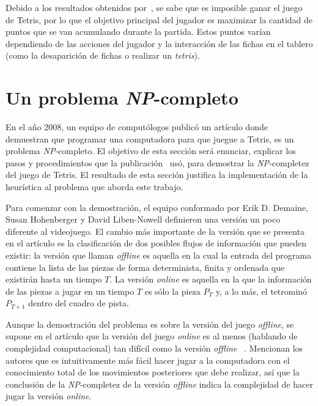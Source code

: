 Debido a los resultados obtenidos por~\cite{Burgiel97howto}, se sabe que es
imposible ganar el juego de Tetris, por lo que el objetivo principal del
jugador es maximizar la cantidad de puntos que se van acumulando durante la
partida. Estos puntos varían dependiendo de las acciones del jugador y la
interacción de las fichas en el tablero (como la desaparición de fichas o
realizar un \textit{tetris}).


\section{Un problema \textsl{NP}-completo}

En el año 2008, un equipo de computólogos publicó un artículo donde demuestran
que programar una computadora para que juegue a Tetris, es un problema \textsl{NP}-completo.
El objetivo de esta sección será enunciar, explicar los pasos y procedimientos
que la publicación~\cite{DBLP:journals/corr/cs-CC-0210020} usó, para demostrar
la \textsl{NP}-completez del juego de Tetris. El resultado de esta sección
justifica la implementación de la heurística al problema que aborda este
trabajo.

Para comenzar con la demostración, el equipo conformado por Erik D. Demaine,
Susan Hohenberger y David Liben-Nowell definieron una versión un poco diferente
al videojuego. El cambio más importante de la versión que se presenta en el artículo
es la clasificación de dos posibles flujos de información que pueden existir:
la versión que llaman \textit{offline} es aquella en la cual la entrada del programa
contiene la lista de las piezas de forma determinista, finita y ordenada que existirán
hasta un tiempo $T$. La versión \textit{online} es aquella en la que la
información de las piezas a jugar en un tiempo $T$ es sólo la pieza $P_{T}$
y, a lo más, el tetrominó $P_{T+1}$ dentro del cuadro de pista.

Aunque la demostración del problema es sobre la versión del juego
\textit{offline}, se supone en el artículo que la versión del juego \textit{online} es al menos
(hablando de complejidad computacional) tan difícil como la versión
\textit{offline}~\cite{DBLP:journals/corr/cs-CC-0210020} \cite{boumaza:hal-00926213}.
Mencionan los autores que es intuitivamente más fácil hacer jugar a la computadora con el conocimiento
total de los movimientos posteriores que debe realizar, así que la conclusión
de la \textsl{NP}-completez de la versión \textit{offline} indica la complejidad
de hacer jugar la versión \textit{online}.

